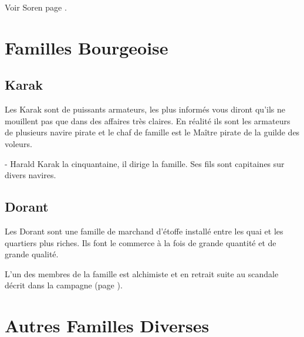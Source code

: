 Voir Soren page \pageref{SorenVH}.

\section{Familles Bourgeoise}

\subsection*{Karak}

Les Karak sont de puissants armateurs, les plus informés vous diront qu'ils
ne mouillent pas que dans des affaires très claires. En réalité ils sont les
armateurs de plusieurs navire pirate et le chaf de famille est le Maître pirate
de la guilde des voleurs.

- Harald Karak la cinquantaine, il dirige la famille. Ses fils sont capitaines 
sur divers navires. 

\subsection*{Dorant}

Les Dorant sont une famille de marchand d'étoffe installé entre les quai et
les quartiers plus riches. Ils font le commerce à la fois de grande 
quantité et de grande qualité. 

L'un des membres de la famille est alchimiste et en retrait suite au 
scandale décrit dans la campagne (page \pageref{TAS-Magie}).

\section{Autres Familles Diverses}

